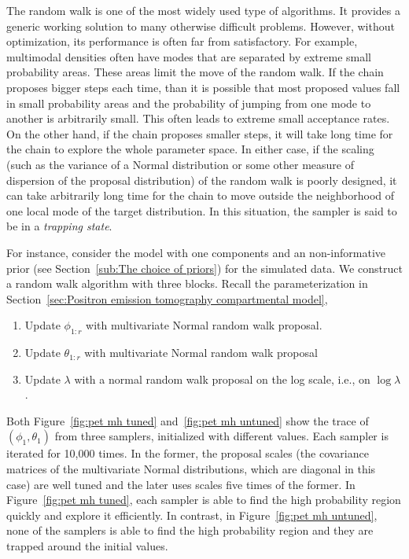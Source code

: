 The random walk is one of the most widely used type of \mcmc algorithms. It
provides a generic working solution to many otherwise difficult problems.
However, without optimization, its performance is often far from satisfactory.
For example, multimodal densities often have modes that are separated by
extreme small probability areas. These areas limit the move of the random
walk. If the chain proposes bigger steps each time, than it is possible that
most proposed values fall in small probability areas and the probability of
jumping from one mode to another is arbitrarily small. This often leads to
extreme small acceptance rates. On the other hand, if the chain proposes
smaller steps, it will take long time for the chain to explore the whole
parameter space. In either case, if the scaling (such as the variance of a
Normal distribution or some other measure of dispersion of the proposal
distribution) of the random walk is poorly designed, it can take arbitrarily
long time for the chain to move outside the neighborhood of one local mode of
the target distribution. In this situation, the sampler is said to be in a
\emph{trapping state}.

For instance, consider the \pet model with one components and an
non-informative prior (see Section~\ref{sub:The choice of priors}) for the
simulated data. We construct a random walk algorithm with three blocks. Recall
the parameterization in Section~\ref{sec:Positron emission tomography
  compartmental model},
\begin{enumerate}
  \item Update $\phi_{1:r}$ with multivariate Normal random walk proposal.
  \item Update $\theta_{1:r}$ with multivariate Normal random walk proposal
  \item Update $\lambda$ with a normal random walk proposal on the log scale,
    i.e., on $\log\lambda$.
\end{enumerate}
Both Figure~\ref{fig:pet mh tuned} and~\ref{fig:pet mh untuned} show the trace
of $(\phi_1, \theta_1)$ from three samplers, initialized with different
values. Each sampler is iterated for 10,000 times. In the former, the proposal
scales (the covariance matrices of the multivariate Normal distributions,
which are diagonal in this case) are well tuned and the later uses scales five
times of the former. In Figure~\ref{fig:pet mh tuned}, each sampler is able to
find the high probability region quickly and explore it efficiently. In
contrast, in Figure~\ref{fig:pet mh untuned}, none of the samplers is able to
find the high probability region and they are trapped around the initial
values.

